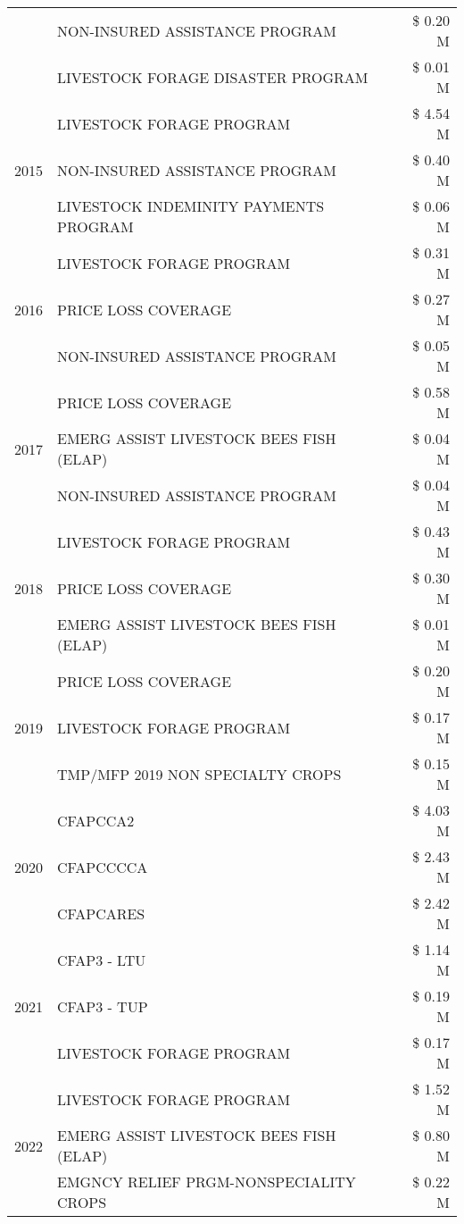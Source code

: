 \begin{tabular}{llr}
 & NON-INSURED ASSISTANCE PROGRAM & \$ 0.20 M \\
 & LIVESTOCK FORAGE DISASTER PROGRAM & \$ 0.01 M \\
\cline{1-3}
\multirow[t]{3}{*}{2015} & LIVESTOCK FORAGE PROGRAM & \$ 4.54 M \\
 & NON-INSURED ASSISTANCE PROGRAM & \$ 0.40 M \\
 & LIVESTOCK INDEMINITY PAYMENTS PROGRAM & \$ 0.06 M \\
\cline{1-3}
\multirow[t]{3}{*}{2016} & LIVESTOCK FORAGE PROGRAM & \$ 0.31 M \\
 & PRICE LOSS COVERAGE & \$ 0.27 M \\
 & NON-INSURED ASSISTANCE PROGRAM & \$ 0.05 M \\
\cline{1-3}
\multirow[t]{3}{*}{2017} & PRICE LOSS COVERAGE & \$ 0.58 M \\
 & EMERG ASSIST LIVESTOCK BEES FISH (ELAP) & \$ 0.04 M \\
 & NON-INSURED ASSISTANCE PROGRAM & \$ 0.04 M \\
\cline{1-3}
\multirow[t]{3}{*}{2018} & LIVESTOCK FORAGE PROGRAM & \$ 0.43 M \\
 & PRICE LOSS COVERAGE & \$ 0.30 M \\
 & EMERG ASSIST LIVESTOCK BEES FISH (ELAP) & \$ 0.01 M \\
\cline{1-3}
\multirow[t]{3}{*}{2019} & PRICE LOSS COVERAGE & \$ 0.20 M \\
 & LIVESTOCK FORAGE PROGRAM & \$ 0.17 M \\
 & TMP/MFP 2019 NON SPECIALTY CROPS & \$ 0.15 M \\
\cline{1-3}
\multirow[t]{3}{*}{2020} & CFAPCCA2 & \$ 4.03 M \\
 & CFAPCCCCA & \$ 2.43 M \\
 & CFAPCARES & \$ 2.42 M \\
\cline{1-3}
\multirow[t]{3}{*}{2021} & CFAP3 - LTU & \$ 1.14 M \\
 & CFAP3 - TUP & \$ 0.19 M \\
 & LIVESTOCK FORAGE PROGRAM & \$ 0.17 M \\
\cline{1-3}
\multirow[t]{3}{*}{2022} & LIVESTOCK FORAGE PROGRAM & \$ 1.52 M \\
 & EMERG ASSIST LIVESTOCK BEES FISH (ELAP) & \$ 0.80 M \\
 & EMGNCY RELIEF PRGM-NONSPECIALITY CROPS & \$ 0.22 M \\
\cline{1-3}
\bottomrule
\end{tabular}
